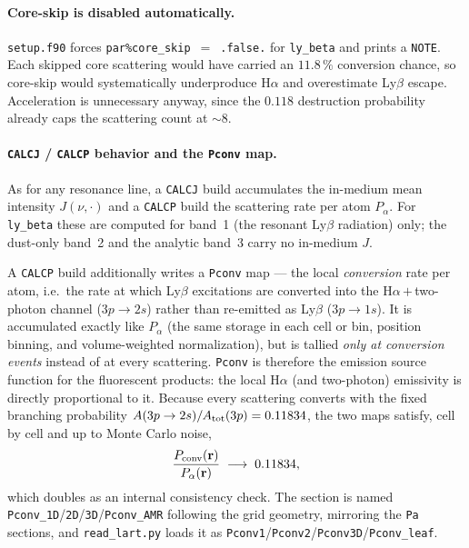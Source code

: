 \documentclass[english,a4paper]{my_memo}
\newcommand{\parm}[1]{\texttt{par\%#1}}
\begin{document}
\paragraph{Core-skip is disabled automatically.}
\texttt{setup.f90} forces \parm{core\_skip}~$=$~\texttt{.false.} for
\texttt{ly\_beta} and prints a \texttt{NOTE}. Each skipped core scattering would
have carried an $11.8\,\%$ conversion chance, so core-skip would systematically
underproduce H$\alpha$ and overestimate Ly$\beta$ escape. Acceleration is
unnecessary anyway, since the $0.118$ destruction probability already caps the
scattering count at $\sim 8$.

\paragraph{\texttt{CALCJ} / \texttt{CALCP} behavior and the \texttt{Pconv} map.}
As for any resonance line, a \texttt{CALCJ} build accumulates the in-medium mean
intensity $J(\nu,\cdot)$ and a \texttt{CALCP} build the scattering rate per atom
$P_\alpha$. For \texttt{ly\_beta} these are computed for band~1 (the resonant
Ly$\beta$ radiation) only; the dust-only band~2 and the analytic band~3 carry no
in-medium $J$.

A \texttt{CALCP} build additionally writes a \texttt{Pconv} map --- the local
\emph{conversion} rate per atom, i.e.\ the rate at which Ly$\beta$ excitations
are converted into the H$\alpha$\,$+$\,two-photon channel ($3p\rightarrow2s$)
rather than re-emitted as Ly$\beta$ ($3p\rightarrow1s$). It is accumulated
exactly like $P_\alpha$ (the same storage in each cell or bin, position binning, and
volume-weighted normalization), but is tallied \emph{only at conversion events}
instead of at every scattering. \texttt{Pconv} is therefore the emission source
function for the fluorescent products: the local H$\alpha$ (and two-photon)
emissivity is directly proportional to it. Because every scattering converts
with the fixed branching probability
$A(3p\rightarrow2s)/A_{\rm tot}(3p) = 0.11834$, the two maps satisfy, cell by
cell and up to Monte Carlo noise,
\begin{equation}
  \frac{P_{\rm conv}(\mathbf{r})}{P_\alpha(\mathbf{r})} \;\longrightarrow\; 0.11834,
  \label{eq:pconv_ratio}
\end{equation}
which doubles as an internal consistency check. The section is named
\texttt{Pconv\_1D}/\texttt{2D}/\texttt{3D}/\texttt{Pconv\_AMR} following the grid
geometry, mirroring the \texttt{Pa} sections, and \texttt{read\_lart.py} loads it
as \texttt{Pconv1}/\texttt{Pconv2}/\texttt{Pconv3D}/\texttt{Pconv\_leaf}.
\end{document}
